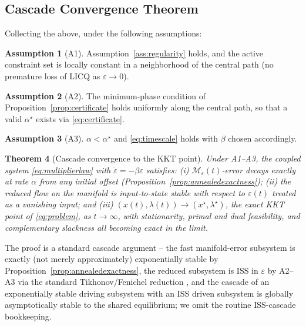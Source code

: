 \documentclass[11pt,onecolumn]{article}
\newtheorem{theorem}{Theorem}[section]
\theoremstyle{definition}
\newtheorem{assumption}[theorem]{Assumption}
\theoremstyle{remark}
\newcommand{\Mveps}{\mathcal{M}_\varepsilon}
\begin{document}
\subsection{Cascade Convergence Theorem}
Collecting the above, under the following assumptions:

\begin{assumption}[A1] \label{ass:a1}
Assumption~\ref{ass:regularity} holds, and the active constraint set is locally constant in a
neighborhood of the central path (no premature loss of LICQ as $\varepsilon \to 0$).
\end{assumption}

\begin{assumption}[A2] \label{ass:a2}
The minimum-phase condition of Proposition~\ref{prop:certificate} holds uniformly along the
central path, so that a valid $\alpha^\star$ exists via \eqref{eq:certificate}.
\end{assumption}

\begin{assumption}[A3] \label{ass:a3}
$\alpha < \alpha^\star$ and \eqref{eq:timescale} holds with $\beta$ chosen accordingly.
\end{assumption}

\begin{theorem}[Cascade convergence to the KKT point] \label{thm:cascade}
Under A1--A3, the coupled system \eqref{eq:multiplierlaw} with $\dot\varepsilon = -\beta\varepsilon$
satisfies: (i) $\Mveps(t)$-error decays exactly at rate $\alpha$ from any initial offset
(Proposition~\ref{prop:annealedexactness}); (ii) the reduced flow on the manifold is
input-to-state stable with respect to $\varepsilon(t)$ treated as a vanishing input; and (iii)
$(x(t), \lambda(t)) \to (x^\star, \lambda^\star)$, the exact KKT point of \eqref{eq:problem}, as
$t \to \infty$, with stationarity, primal and dual feasibility, and complementary slackness all
becoming exact in the limit.
\end{theorem}

The proof is a standard cascade argument -- the fast manifold-error subsystem is exactly (not
merely approximately) exponentially stable by Proposition~\ref{prop:annealedexactness}, the
reduced subsystem is ISS in $\varepsilon$ by A2--A3 via the standard Tikhonov/Fenichel
reduction \cite{fenichel1979,khalil2002}, and the cascade of an exponentially stable driving
subsystem with an ISS driven subsystem is globally asymptotically stable to the shared
equilibrium; we omit the routine ISS-cascade bookkeeping.
\end{document}
